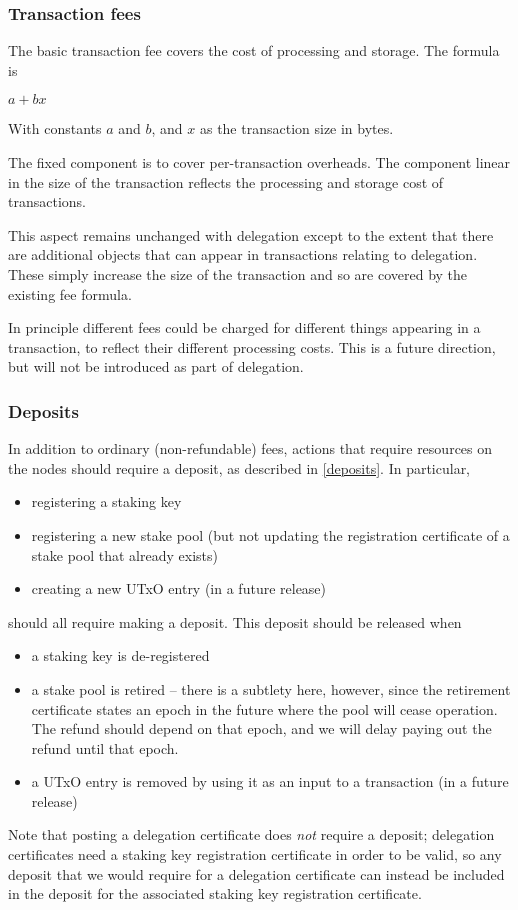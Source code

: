 \documentclass[11pt,a4paper]{article}
\begin{document}
\subsubsection{Transaction fees}
\label{transaction-fees}

The basic transaction fee covers the cost of processing and storage. The
formula is

\(a + b x\)

With constants \(a\) and \(b\), and \(x\) as the transaction size in
bytes.

The fixed component is to cover per-transaction overheads. The component
linear in the size of the transaction reflects the processing and
storage cost of transactions.

This aspect remains unchanged with delegation except to the extent that
there are additional objects that can appear in transactions relating to
delegation. These simply increase the size of the transaction and so are
covered by the existing fee formula.

In principle different fees could be charged for different things
appearing in a transaction, to reflect their different processing costs.
This is a future direction, but will not be introduced as part of
delegation.

\subsubsection{Deposits}
\label{fees-deposits}

In addition to ordinary (non-refundable) fees, actions that require
resources on the nodes should require a deposit, as described in
\cref{deposits}. In particular,
\begin{itemize}
\item registering a staking key
\item registering a new stake pool (but not updating the registration
  certificate of a stake pool that already exists)
\item creating a new UTxO entry (in a future release)
\end{itemize}
should all require making a deposit. This deposit should be released
when
\begin{itemize}
\item a staking key is de-registered
\item a stake pool is retired -- there is a subtlety here, however,
  since the retirement certificate states an epoch in the future where
  the pool will cease operation. The refund should depend on that
  epoch, and we will delay paying out the refund until that epoch.
\item a UTxO entry is removed by using it as an input to a transaction (in a
  future release)
\end{itemize}
Note that posting a delegation certificate does \emph{not} require a
deposit; delegation certificates need a staking key registration
certificate in order to be valid, so any deposit that we would require
for a delegation certificate can instead be included in the deposit
for the associated staking key registration certificate.
\end{document}
